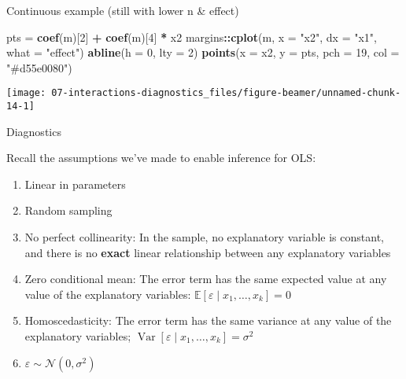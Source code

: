 \documentclass[
  ignorenonframetext,
]{beamer}
\newenvironment{Shaded}{\begin{snugshade}}{\end{snugshade}}
\newcommand{\AttributeTok}[1]{\textcolor[rgb]{0.13,0.29,0.53}{#1}}
\newcommand{\DecValTok}[1]{\textcolor[rgb]{0.00,0.00,0.81}{#1}}
\newcommand{\FunctionTok}[1]{\textcolor[rgb]{0.13,0.29,0.53}{\textbf{#1}}}
\newcommand{\NormalTok}[1]{#1}
\newcommand{\OtherTok}[1]{\textcolor[rgb]{0.56,0.35,0.01}{#1}}
\newcommand{\SpecialCharTok}[1]{\textcolor[rgb]{0.81,0.36,0.00}{\textbf{#1}}}
\newcommand{\StringTok}[1]{\textcolor[rgb]{0.31,0.60,0.02}{#1}}
\providecommand{\tightlist}{%
  \setlength{\itemsep}{0pt}\setlength{\parskip}{0pt}}
\newcommand{\setsep}{\setlength{\itemsep}{3pt}}
\newcommand{\setskip}{\setlength{\parskip}{3pt}}
\renewcommand{\tightlist}{\setsep\setskip}
\begin{document}
\begin{frame}[fragile]{Continuous example (still with lower n \& effect)}
\label{continuous-example-still-with-lower-n-effect-1}
\begin{Shaded}
\begin{Highlighting}[]
\NormalTok{pts }\OtherTok{=} \FunctionTok{coef}\NormalTok{(m)[}\DecValTok{2}\NormalTok{] }\SpecialCharTok{+} \FunctionTok{coef}\NormalTok{(m)[}\DecValTok{4}\NormalTok{] }\SpecialCharTok{*}\NormalTok{ x2}
\NormalTok{margins}\SpecialCharTok{::}\FunctionTok{cplot}\NormalTok{(m, }\AttributeTok{x =} \StringTok{"x2"}\NormalTok{, }\AttributeTok{dx =} \StringTok{"x1"}\NormalTok{, }\AttributeTok{what =} \StringTok{"effect"}\NormalTok{)}
\FunctionTok{abline}\NormalTok{(}\AttributeTok{h =} \DecValTok{0}\NormalTok{, }\AttributeTok{lty =} \DecValTok{2}\NormalTok{)}
\FunctionTok{points}\NormalTok{(}\AttributeTok{x =}\NormalTok{ x2, }\AttributeTok{y =}\NormalTok{ pts, }\AttributeTok{pch =} \DecValTok{19}\NormalTok{, }\AttributeTok{col =} \StringTok{"\#d55e0080"}\NormalTok{)}
\end{Highlighting}
\end{Shaded}

\texttt{[image: 07-interactions-diagnostics\_files/figure-beamer/unnamed-chunk-14-1]}
\end{frame}

\begin{frame}{Diagnostics}
\label{diagnostics}
\pause

Recall the assumptions we've made to enable inference for OLS:

\begin{enumerate}
\tightlist
\item
  Linear in parameters
\item
  Random sampling
\item
  No perfect collinearity: In the sample, no explanatory variable is constant, and there is no \textbf{exact} linear relationship between any explanatory variables
\item
  Zero conditional mean: The error term has the same expected value at any value of the explanatory variables: \(\ensuremath{\mathbb{E}\left[\varepsilon \mid x_1, \dots, x_k\right]} = 0\)
\item
  Homoscedasticity: The error term has the same variance at any value of the explanatory variables; \(\ensuremath{\mathop{\mathrm{Var}}\left[\varepsilon \mid x_1, \dots, x_k\right]} = \sigma^2\)
\item
  \(\varepsilon \sim \mathcal{N}\left( 0, \sigma^2 \right)\)
\end{enumerate}
\end{frame}
\end{document}
